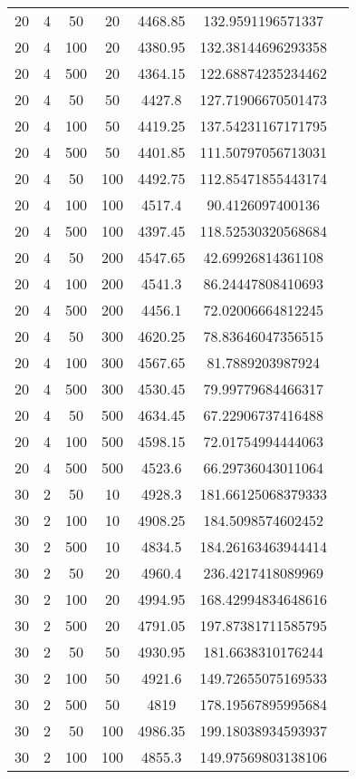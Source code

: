 {\begin{longtabu}{S
S
S
S
S
S[round-mode=places, round-precision=0]
S[round-mode=places, round-precision=0]}
20 & 4 & 50 & 20 & 4468.85 & 132.9591196571337 \\
20 & 4 & 100 & 20 & 4380.95 & 132.38144696293358 \\
20 & 4 & 500 & 20 & 4364.15 & 122.68874235234462 \\
20 & 4 & 50 & 50 & 4427.8 & 127.71906670501473 \\
20 & 4 & 100 & 50 & 4419.25 & 137.54231167171795 \\
20 & 4 & 500 & 50 & 4401.85 & 111.50797056713031 \\
20 & 4 & 50 & 100 & 4492.75 & 112.85471855443174 \\
20 & 4 & 100 & 100 & 4517.4 & 90.4126097400136 \\
20 & 4 & 500 & 100 & 4397.45 & 118.52530320568684 \\
20 & 4 & 50 & 200 & 4547.65 & 42.69926814361108 \\
20 & 4 & 100 & 200 & 4541.3 & 86.24447808410693 \\
20 & 4 & 500 & 200 & 4456.1 & 72.02006664812245 \\
20 & 4 & 50 & 300 & 4620.25 & 78.83646047356515 \\
20 & 4 & 100 & 300 & 4567.65 & 81.7889203987924 \\
20 & 4 & 500 & 300 & 4530.45 & 79.99779684466317 \\
20 & 4 & 50 & 500 & 4634.45 & 67.22906737416488 \\
20 & 4 & 100 & 500 & 4598.15 & 72.01754994444063 \\
20 & 4 & 500 & 500 & 4523.6 & 66.29736043011064 \\
30 & 2 & 50 & 10 & 4928.3 & 181.66125068379333 \\
30 & 2 & 100 & 10 & 4908.25 & 184.5098574602452 \\
30 & 2 & 500 & 10 & 4834.5 & 184.26163463944414 \\
30 & 2 & 50 & 20 & 4960.4 & 236.4217418089969 \\
30 & 2 & 100 & 20 & 4994.95 & 168.42994834648616 \\
30 & 2 & 500 & 20 & 4791.05 & 197.87381711585795 \\
30 & 2 & 50 & 50 & 4930.95 & 181.6638310176244 \\
30 & 2 & 100 & 50 & 4921.6 & 149.72655075169533 \\
30 & 2 & 500 & 50 & 4819 & 178.19567895995684 \\
30 & 2 & 50 & 100 & 4986.35 & 199.18038934593937 \\
30 & 2 & 100 & 100 & 4855.3 & 149.97569803138106 \\

\end{longtabu}}
